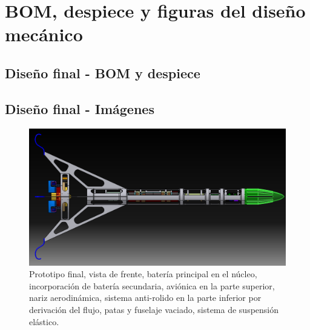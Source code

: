 \section{BOM, despiece y figuras del diseño mecánico}

\subsection{Diseño final - BOM y despiece}


\subsection{Diseño final - Imágenes}
\begin{figure}[htb]
    \centering
    \includegraphics[height=0.3\pdfpageheight,angle=90]{fig/design/v6}
    \caption{Prototipo final, vista de frente, batería principal en el núcleo, incorporación de batería secundaria, aviónica en la parte superior, nariz aerodinámica, sistema anti-rolido en la parte inferior por derivación del flujo, patas y fuselaje vaciado, sistema de suspensión elástico.}
    \label{fig:design/v6}
\end{figure}

